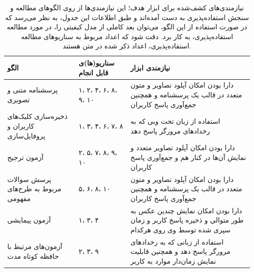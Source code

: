 \begin{table}[H]
	\caption[
	نیازمندی‌های کشف‌شده برای ابزار هدف
	]{
		نیازمندی‌های کشف‌شده برای ابزار هدف؛ این نیازمندی‌ها از روی الگوهای مطالعه و سنجش استفاده‌پذیری به دست آمده‌اند و طبق اطلاعات این جدول، به نظر می‌رسد که در صورت استفاده از این الگو، می‌توان بعد کاملی از مدل کیفیتی را، در مورد مطالعه استفاده‌پذیری، به کار برد. دقت شود که اعداد مربوط به سناریوهای مطالعه استفاده‌پذیری، اعداد ذکر شده در متن هستند.
	}
	\label{tab:requirements}
	\centering
	\begin{tabular}{|C{3cm}|C{3cm}|C{8cm}|}
		\hline
		الگو & سناریو(ها)ی قابل انجام & نیازمندی ابزار \\ \hline
		پرسشنامه متنی و تصویری & ۱، ۲، ۴، ۶، ۸، ۹، ۱۰ & دارا بودن امکان آپلود تصاویر و متون متعدد در قالب یک پرسشنامه و همچنین جمع‌آوری پاسخ کاربران \\ \hline
		ذخیره‌سازی کلیک‌های کاربران و پروفایل‌سازی & ۱، ۳، ۴، ۶، ۷، ۸ & استفاده از زبان تحت وبی که به رخدادهای مرورگر پاسخ دهد \\ \hline
		آزمون ترجیح & ۲، ۵، ۷، ۸، ۹، ۱۰ & دارا بودن امکان آپلود تصاویر متعدد و نمایش آن‌ها در کنار هم و جمع‌آوری پاسخ کاربران \\ \hline
		پرسش سوالات مربوط به طرح‌های مفهومی & ۵، ۶، ۸، ۱۰ & دارا بودن امکان آپلود تصاویر و متون متعدد در قالب یک پرسشنامه و همچنین جمع‌آوری پاسخ کاربران \\ \hline
		آزمون پیمایشی & ۱، ۳، ۴ & دارا بودن امکان نمایش چندین عکس به طور متوالی و ذخیره پاسخ کاربر و زمان سپری شده توسط وی روی هرکدام \\ \hline
		آزمون‌های مرتبط با حافظه کوتاه مدت & ۲، ۳، ۹ & استفاده از زبانی که به رخدادهای مرورگر پاسخ دهد و همچنین قابلیت نمایش زمان‌دار موارد به کاربر \\ \hline
	\end{tabular}
\end{table}
